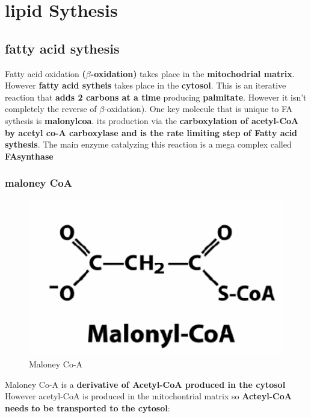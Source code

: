 \documentclass[../main.tex]{subfiles}
\begin{document}
	

\section{lipid Sythesis}
\subsection{fatty acid sythesis}
Fatty acid oxidation \textbf{($\beta$-oxidation)} takes place in the \textbf{mitochodrial matrix}. However \textbf{fatty acid sytheis} takes place in the \textbf{cytosol}. This is an iterative reaction that \textbf{adds 2 carbons at a time} producing  \textbf{palmitate}. However it isn't completely the reverse of $\beta$-oxidation). One key molecule that is unique to FA sythesis is \textbf{\gls{malonylcoa}}. its production via the \textbf{carboxylation of acetyl-CoA by acetyl co-A carboxylase and is the rate limiting step of Fatty acid sythesis}. The main enzyme catalyzing this reaction is a mega complex called \textbf{\gls{FAsynthase}}
\subsubsection{maloney CoA}
\begin{figure}[H]
    \centering
    \includegraphics[width=0.25\linewidth]{Maloney.png}
    \caption{Maloney Co-A}
    \label{fig:enter-label}
\end{figure}
Maloney Co-A is a \textbf{derivative of Acetyl-CoA produced in the cytosol} However acetyl-CoA is produced in the mitochontrial matrix so \textbf{Acteyl-CoA needs to be transported to the cytosol}:
\end{document}

